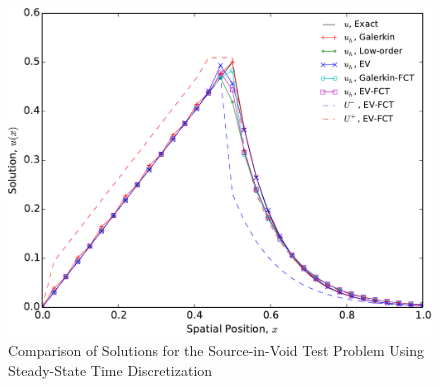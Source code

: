 \begin{figure}[htb]
   \centering
      \includegraphics[width=\textwidth]
        {images/solution_source_in_void.pdf}
      \caption{Comparison of Solutions for the Source-in-Void Test
       Problem Using Steady-State Time Discretization}
   \label{fig:source_in_void}
\end{figure}
%

\clearpage
